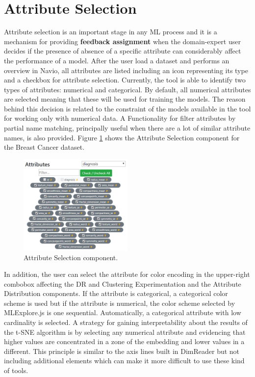 \section{Attribute Selection}
\label{section3.3}

Attribute selection is an important stage in any ML process and it is a mechanism for providing \textbf{feedback assignment} when the domain-expert user decides if the presence of absence of a specific attribute can considerably affect the performance of a model. After the user load a dataset and performs an overview in Navio, all attributes are listed including an icon representing its type and a checkbox for attribute selection. Currently, the tool is able to identify two types of attributes: numerical and categorical. By default, all numerical attributes are selected meaning that these will be used for training the models. The reason behind this decision is related to the constraint of the models available in the tool for working only with numerical data. A Functionality for filter attributes by partial name matching, principally useful when there are a lot of similar attribute names, is also provided. Figure \ref{fig:attribute-selection-component} shows the Attribute Selection component for the Breast Cancer dataset.

\begin{figure}[ht]
 \centering
 \includegraphics[width=0.5\textwidth]{attribute-selection.png}
 \caption{Attribute Selection component.}
 \label{fig:attribute-selection-component}
\end{figure}

In addition, the user can select the attribute for color encoding in the upper-right combobox affecting the DR and Clustering Experimentation and the Attribute Distribution components. If the attribute is categorical, a categorical color scheme is used but if the attribute is numerical, the color scheme selected by MLExplore.js is one sequential. Automatically, a categorical attribute with low cardinality is selected. A strategy for gaining interpretability about the results of the t-SNE algorithm is by selecting any numerical attribute and evidencing that higher values are concentrated in a zone of the embedding and lower values in a different. This principle is similar to the axis lines built in DimReader \cite{Faust2019DimReader:Projections} but not including additional elements which can make it more difficult to use these kind of tools.

